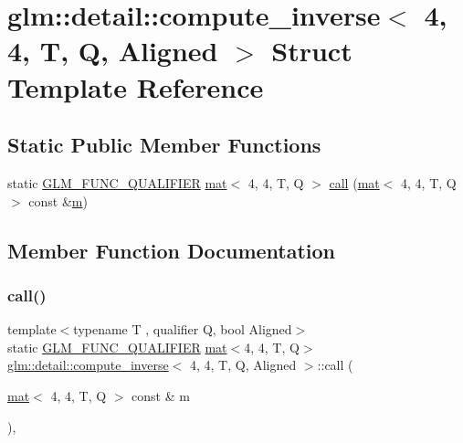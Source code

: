 \hypertarget{structglm_1_1detail_1_1compute__inverse_3_014_00_014_00_01_t_00_01_q_00_01_aligned_01_4}{}\section{glm\+:\+:detail\+:\+:compute\+\_\+inverse$<$ 4, 4, T, Q, Aligned $>$ Struct Template Reference}
\label{structglm_1_1detail_1_1compute__inverse_3_014_00_014_00_01_t_00_01_q_00_01_aligned_01_4}
\subsection*{Static Public Member Functions}
\begin{DoxyCompactItemize}
\item 
static \mbox{\hyperlink{setup_8hpp_a33fdea6f91c5f834105f7415e2a64407}{G\+L\+M\+\_\+\+F\+U\+N\+C\+\_\+\+Q\+U\+A\+L\+I\+F\+I\+ER}} \mbox{\hyperlink{structglm_1_1mat}{mat}}$<$ 4, 4, T, Q $>$ \mbox{\hyperlink{structglm_1_1detail_1_1compute__inverse_3_014_00_014_00_01_t_00_01_q_00_01_aligned_01_4_a113ff9d7721d4a608e8d54fdf4e02fc6}{call}} (\mbox{\hyperlink{structglm_1_1mat}{mat}}$<$ 4, 4, T, Q $>$ const \&\mbox{\hyperlink{_s_d_l__opengl__glext_8h_af593500c283bf1a787a6f947f503a5c2}{m}})
\end{DoxyCompactItemize}


\subsection{Member Function Documentation}
\mbox{\label{structglm_1_1detail_1_1compute__inverse_3_014_00_014_00_01_t_00_01_q_00_01_aligned_01_4_a113ff9d7721d4a608e8d54fdf4e02fc6}} 
\subsubsection{\texorpdfstring{call()}{call()}}
{\footnotesize\ttfamily template$<$typename T , qualifier Q, bool Aligned$>$ \\
static \mbox{\hyperlink{setup_8hpp_a33fdea6f91c5f834105f7415e2a64407}{G\+L\+M\+\_\+\+F\+U\+N\+C\+\_\+\+Q\+U\+A\+L\+I\+F\+I\+ER}} \mbox{\hyperlink{structglm_1_1mat}{mat}}$<$4, 4, T, Q$>$ \mbox{\hyperlink{structglm_1_1detail_1_1compute__inverse}{glm\+::detail\+::compute\+\_\+inverse}}$<$ 4, 4, T, Q, Aligned $>$\+::call (\begin{DoxyParamCaption}\item[{\mbox{\hyperlink{structglm_1_1mat}{mat}}$<$ 4, 4, T, Q $>$ const \&}]{m }\end{DoxyParamCaption})\hspace{0.3cm}{\ttfamily [inline]}, {\ttfamily [static]}}



